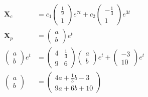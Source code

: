 \documentclass{article}
\begin{document}
\begin{align*}
  \mathbf{X}_c      & = c_1 \begin{pmatrix}
                              \frac{1}{9} \\
                              1
                            \end{pmatrix} e^{7 t} + c_2 \begin{pmatrix}
                                                          -\frac{1}{3} \\
                                                          1
                                                        \end{pmatrix} e^{3 t}                     \\
  \mathbf{X}_p      & = \begin{pmatrix}
                          a \\
                          b
                        \end{pmatrix} e^t                                                         \\
  \begin{pmatrix}
    a \\
    b
  \end{pmatrix} e^t & = \begin{pmatrix}
                          4 & \frac{1}{3} \\
                          9 & 6
                        \end{pmatrix} \begin{pmatrix}
                                        a \\
                                        b
                                      \end{pmatrix} e^t + \begin{pmatrix}
                                                            -3 \\
                                                            10
                                                          \end{pmatrix} e^t                       \\
  \begin{pmatrix}
    a \\
    b
  \end{pmatrix}   & = \begin{pmatrix}
                        4 a + \frac{1}{3} b - 3 \\
                        9 a + 6 b + 10
                      \end{pmatrix}                                                     \\

\end{align*}
\end{document}
